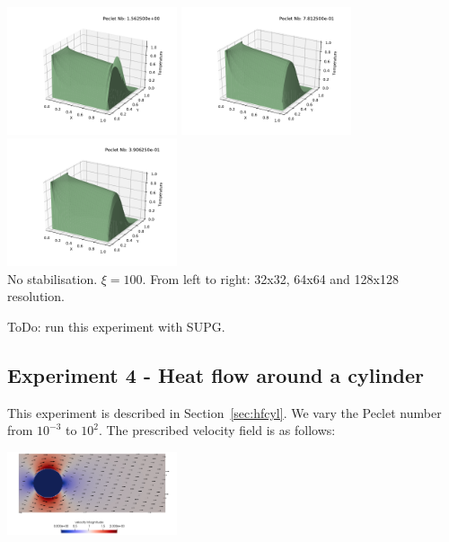 \begin{center}
\includegraphics[width=5cm]{python_codes/fieldstone_65/results/exp3/solution100.pdf}
\includegraphics[width=5cm]{python_codes/fieldstone_65/results/exp3/solution100_x2.pdf}
\includegraphics[width=5cm]{python_codes/fieldstone_65/results/exp3/solution100_x4.pdf}\\
{\captionfont No stabilisation. $\xi=100$. From left to right: 32x32, 64x64 and 128x128 resolution.}
\end{center}

ToDo: run this experiment with SUPG.

\subsection*{Experiment 4 - Heat flow around a cylinder} 

This experiment is described in Section~\ref{sec:hfcyl}.
We vary the Peclet number from $10^{-3}$ to $10^2$. 
The prescribed velocity field is as follows:

\begin{center}
\includegraphics[width=5cm]{python_codes/fieldstone_65/results/exp4/vel}
\end{center}

